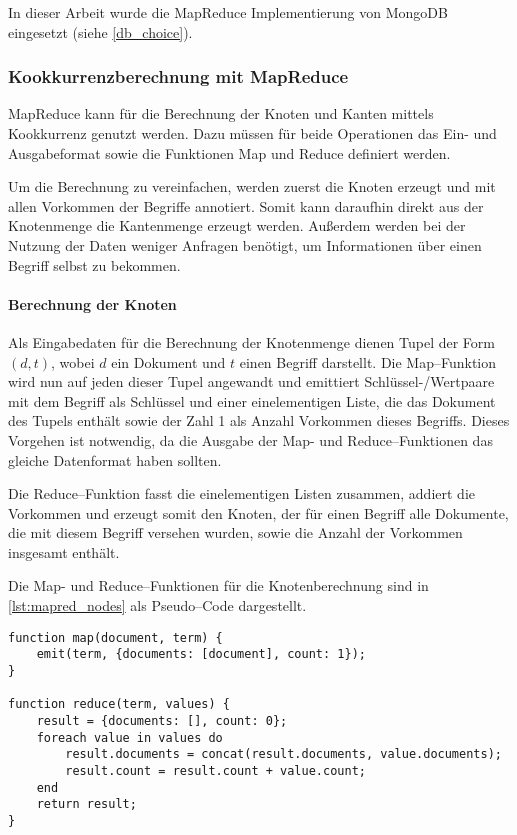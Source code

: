 In dieser Arbeit wurde die MapReduce Implementierung von MongoDB eingesetzt (siehe \cref{db_choice}).

\subsubsection{Kookkurrenzberechnung mit MapReduce}
\label{mapreduce_cooccurence}

MapReduce kann für die Berechnung der Knoten und Kanten mittels Kookkurrenz genutzt werden. Dazu müssen für beide Operationen das Ein- und Ausgabeformat sowie die Funktionen Map und Reduce definiert werden.

Um die Berechnung zu vereinfachen, werden zuerst die Knoten erzeugt und mit allen Vorkommen der Begriffe annotiert. Somit kann daraufhin direkt aus der Knotenmenge die Kantenmenge erzeugt werden. Außerdem werden bei der Nutzung der Daten weniger Anfragen benötigt, um Informationen über einen Begriff selbst zu bekommen.

\paragraph{Berechnung der Knoten}

Als Eingabedaten für die Berechnung der Knotenmenge dienen Tupel der Form \((d, t)\), wobei \(d\) ein Dokument und \(t\) einen Begriff darstellt. Die Map--Funktion wird nun auf jeden dieser Tupel angewandt und emittiert Schlüssel-/Wertpaare mit dem Begriff als Schlüssel und einer einelementigen Liste, die das Dokument des Tupels enthält sowie der Zahl \num{1} als Anzahl Vorkommen dieses Begriffs. Dieses Vorgehen ist notwendig, da die Ausgabe der Map- und Reduce--Funktionen das gleiche Datenformat haben sollten.

Die Reduce--Funktion fasst die einelementigen Listen zusammen, addiert die Vorkommen und erzeugt somit den Knoten, der für einen Begriff alle Dokumente, die mit diesem Begriff versehen wurden, sowie die Anzahl der Vorkommen insgesamt enthält.

Die Map- und Reduce--Funktionen für die Knotenberechnung sind in \cref{lst:mapred_nodes} als Pseudo--Code dargestellt.

\begin{lstlisting}[language=pseudo, label={lst:mapred_nodes}, caption={Knotenerzeugung mit MapReduce}, float]
function map(document, term) {
    emit(term, {documents: [document], count: 1});
}

function reduce(term, values) {
    result = {documents: [], count: 0};
    foreach value in values do
        result.documents = concat(result.documents, value.documents);
        result.count = result.count + value.count;
    end
    return result;
}
\end{lstlisting}

